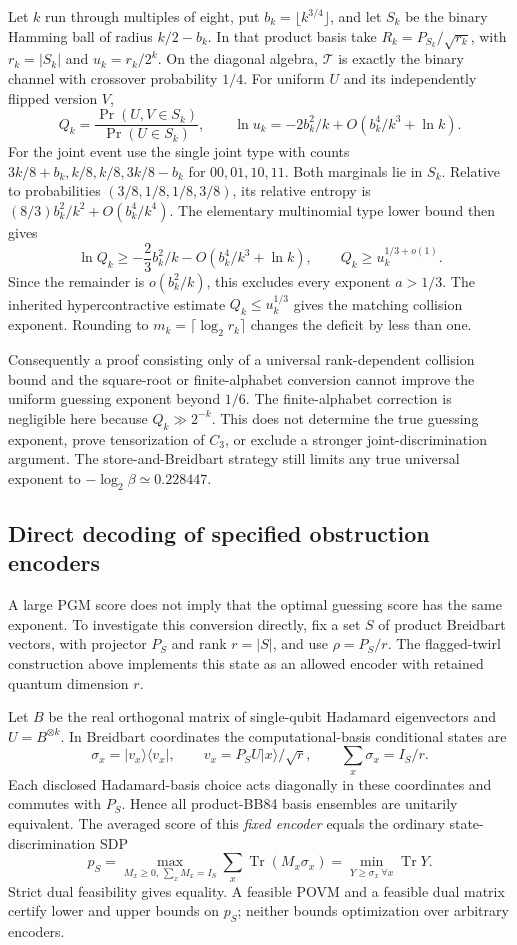 \documentclass[11pt,a4paper]{article}
\newcommand{\Tr}{\operatorname{Tr}}
\begin{document}
Let $k$ run through multiples of eight, put $b_k=\lfloor k^{3/4}\rfloor$, and let $S_k$ be the binary Hamming ball of radius $k/2-b_k$. In that product basis take $R_k=P_{S_k}/\sqrt{r_k}$, with $r_k=|S_k|$ and $u_k=r_k/2^k$. On the diagonal algebra, $\mathcal T$ is exactly the binary channel with crossover probability $1/4$. For uniform $U$ and its independently flipped version $V$,
\[
Q_k=\frac{\Pr(U,V\in S_k)}{\Pr(U\in S_k)},\qquad
\ln u_k=-2b_k^2/k+O(b_k^4/k^3+\ln k).
\]
For the joint event use the single joint type with counts $3k/8+b_k,k/8,k/8,3k/8-b_k$ for $00,01,10,11$. Both marginals lie in $S_k$. Relative to probabilities $(3/8,1/8,1/8,3/8)$, its relative entropy is $(8/3)b_k^2/k^2+O(b_k^4/k^4)$. The elementary multinomial type lower bound then gives
\[
\ln Q_k\ge-\frac23b_k^2/k-O(b_k^4/k^3+\ln k),
\qquad Q_k\ge u_k^{1/3+o(1)}.
\]
Since the remainder is $o(b_k^2/k)$, this excludes every exponent $a>1/3$. The inherited hypercontractive estimate $Q_k\le u_k^{1/3}$ gives the matching collision exponent. Rounding to $m_k=\lceil\log_2r_k\rceil$ changes the deficit by less than one.

Consequently a proof consisting only of a universal rank-dependent collision bound and the square-root or finite-alphabet conversion cannot improve the uniform guessing exponent beyond $1/6$. The finite-alphabet correction is negligible here because $Q_k\gg2^{-k}$. This does not determine the true guessing exponent, prove tensorization of $C_3$, or exclude a stronger joint-discrimination argument. The store-and-Breidbart strategy still limits any true universal exponent to $-\log_2\beta\simeq0.228447$.

\subsection{Direct decoding of specified obstruction encoders}
A large PGM score does not imply that the optimal guessing score has the same exponent. To investigate this conversion directly, fix a set $S$ of product Breidbart vectors, with projector $P_S$ and rank $r=|S|$, and use $\rho=P_S/r$. The flagged-twirl construction above implements this state as an allowed encoder with retained quantum dimension $r$.

Let $B$ be the real orthogonal matrix of single-qubit Hadamard eigenvectors and $U=B^{\otimes k}$. In Breidbart coordinates the computational-basis conditional states are
\[
\sigma_x=|v_x\rangle\langle v_x|,\qquad
v_x=P_SU|x\rangle/\sqrt r,\qquad
\sum_x\sigma_x=I_S/r.
\]
Each disclosed Hadamard-basis choice acts diagonally in these coordinates and commutes with $P_S$. Hence all product-BB84 basis ensembles are unitarily equivalent. The averaged score of this \emph{fixed encoder} equals the ordinary state-discrimination SDP
\[
p_S=\max_{M_x\ge0,\,\sum_xM_x=I_S}\sum_x\Tr(M_x\sigma_x)
=\min_{Y\ge\sigma_x\ \forall x}\Tr Y.
\]
Strict dual feasibility gives equality. A feasible POVM and a feasible dual matrix certify lower and upper bounds on $p_S$; neither bounds optimization over arbitrary encoders.
\end{document}
